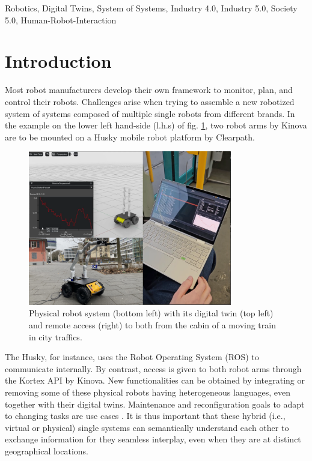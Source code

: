 \documentclass[conference]{IEEEtran}
\begin{document}
\begin{IEEEkeywords}
Robotics, Digital Twins, System of Systems, Industry 4.0, Industry 5.0, Society 5.0, Human-Robot-Interaction
\end{IEEEkeywords}

\section{Introduction}
Most robot manufacturers develop their own framework to monitor, plan, and control their robots. Challenges arise when trying to assemble a new robotized system of systems composed of multiple single robots from different brands.
In the example  on the lower left hand-side (l.h.s) of fig. \ref{fig:TitelBild}, two robot arms by Kinova are to be mounted on a Husky mobile robot platform by Clearpath.
\begin{figure}[htbp]
    \centerline{\includegraphics[width=8.9cm]{Pictures/TitelBild.png}}
    \caption{Physical robot system (bottom left) with its digital twin (top left) and remote access (right) to both from the cabin of a moving train in city traffics.}
    \label{fig:TitelBild}
\end{figure}
The Husky, for instance, uses the Robot Operating System (ROS) to communicate internally. By contrast, access is given to both robot arms through the Kortex API by Kinova. New functionalities can be obtained by integrating or removing  some of these physical robots having heterogeneous languages, even together with  their digital twins.  Maintenance and reconfiguration goals  to adapt to changing tasks are  use cases \cite{mbakop2023integrated}. It is thus important that these hybrid (i.e., virtual or physical) single systems can semantically understand each other to exchange information for they seamless interplay, even when they are  at {distinct geographical locations.}  
\end{document}
